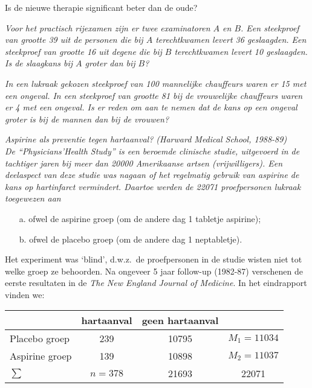 {{\begin{Opgave}
Is de nieuwe therapie significant beter dan de oude?
\end{Opgave}
\begin{opgave}
\label{hypo7}
\em Voor het practisch rijexamen zijn er twee examinatoren $A$ en $B$. Een 
steekproef van grootte 39 uit de personen die bij $A$ terechtkwamen levert 36 
geslaagden. Een steekproef van grootte 16 uit degene die bij $B$ terechtkwamen 
levert 10 geslaagden. Is de slaagkans bij $A$ groter dan bij $B$?
\end{opgave}
\begin{opgave}
\label{hypo8}
\em In een lukraak gekozen steekproef van 100 mannelijke chauffeurs waren er 
15 met
een ongeval. In een steekproef van grootte 81 bij de vrouwelijke chauffeurs 
waren er 4 met een ongeval. Is er reden om aan te nemen dat de kans op een 
ongeval groter is bij de mannen dan bij de vrouwen?
\end{opgave}
\begin{opgave}
\label{hypo9}
\em Aspirine als preventie tegen hartaanval? (Harward Medical School, 1988-89)\\
De ``Physicians'Health Study'' is een beroemde clinische studie, uitgevoerd in 
de tachtiger jaren bij meer dan 20000 Amerikaanse artsen (vrijwilligers). Een 
deelaspect van deze studie was nagaan of het regelmatig gebruik van aspirine de
kans op hartinfarct vermindert. Daartoe werden de 22071 proefpersonen lukraak 
toegewezen aan 
\begin{itemize}
\item[a.] ofwel de aspirine groep (om de andere dag 1 tabletje aspirine);
\item[b.] ofwel de placebo groep (om de andere dag 1 neptabletje).
\end{itemize}
Het experiment was `blind', d.w.z.\ de proefpersonen in de studie wisten niet 
tot welke groep ze behoorden. Na ongeveer 5 jaar follow-up (1982-87) verschenen
de eerste resultaten in de {\em The New England Journal of Medicine}. In het 
eindrapport vinden we:

\begin{center}
\begin{tabular}{l|c|c|c}
  & hartaanval & geen hartaanval & \\
  \hline
Placebo groep & 239 & 10795 & $M_1=11034$\\
  \hline
Aspirine groep & 139 & 10898 & $M_2=11037$\\
  \hline
$\sum$ & $n=378$ & 21693 & 22071
\end{tabular}
  \end{center}


\end{opgave}}}
